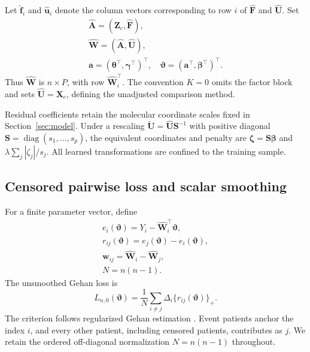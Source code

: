 Let $\widehat{\bm{f}}_i$ and $\widehat{\bm{u}}_i$ denote the column vectors corresponding to row $i$ of $\widehat{\bm{F}}$ and $\widehat{\bm{U}}$. Set
\begin{equation}
 \begin{gathered}
\widehat{\bm{A}}=(\bm{Z}_c,\widehat{\bm{F}}),\\
 \widehat{\bm{W}}=(\widehat{\bm{A}},\widehat{\bm{U}}),\\
 \bm{a}=(\bm{\theta}^\top,\bm{\gamma}^\top)^\top,\quad
 \bm{\vartheta}=(\bm{a}^\top,\bm{\beta}^\top)^\top.
 \end{gathered}
 \label{eq:feasible-design}
\end{equation}
Thus $\widehat{\bm{W}}$ is $n\times P$, with row $\widehat{\bm{W}}_i^\top$. The convention $K=0$ omits the factor block and sets $\widehat{\bm{U}}=\bm{X}_c$, defining the unadjusted comparison method.

Residual coefficients retain the molecular coordinate scales fixed in Section~\ref{sec:model}. Under a rescaling $\widetilde{\bm{U}}=\widehat{\bm{U}} \bm{S}^{-1}$ with positive diagonal $\bm{S}=\operatorname{diag}(s_1,\ldots,s_p)$, the equivalent coordinates and penalty are $\bm{\zeta}=\bm{S}\bm{\beta}$ and $\lambda\sum_j|\zeta_j|/s_j$. All learned transformations are confined to the training sample.

\subsection{Censored pairwise loss and scalar smoothing}
\label{subsec:smoothed-loss}
For a finite parameter vector, define
\begin{equation}
 \begin{gathered}
e_i(\bm{\vartheta})=Y_i-\widehat{\bm{W}}_i^\top\bm{\vartheta},\\
 r_{ij}(\bm{\vartheta})=e_j(\bm{\vartheta})-e_i(\bm{\vartheta}),\\
 \bm{w}_{ij}=\widehat{\bm{W}}_i-\widehat{\bm{W}}_j,\\
 N=n(n-1).
 \end{gathered}
 \label{eq:residual-pairs}
\end{equation}
The unsmoothed Gehan loss is
\begin{equation}
 L_{n,0}(\bm{\vartheta})
 =\frac1N\sum_{i\ne j}\Delta_i\{r_{ij}(\bm{\vartheta})\}_+.
 \label{eq:gehan-feasible}
\end{equation}
The criterion follows regularized Gehan estimation \citep{CaiEtAl2009,SuderMolstad2022}. Event patients anchor the index $i$, and every other patient, including censored patients, contributes as $j$. We retain the ordered off-diagonal normalization $N=n(n-1)$ throughout.

